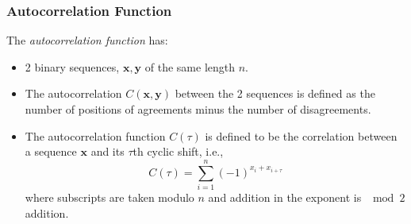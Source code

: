 \subsubsection{Autocorrelation Function}\label{subsubsec:Autocorrelation_Function}
\begin{definition}\label{def:LFSR_Autocorrelation_Function}
  The \emph{autocorrelation function} has:
  \begin{itemize}[noitemsep]
  \item 2 binary sequences, $\mathbf{x}, \mathbf{y}$ of the same length $n$.
  \item The autocorrelation $C(\mathbf{x}, \mathbf{y})$ between the 2 sequences is defined as the number of positions of agreements minus the number of disagreements.
  \item The autocorrelation function $C(\tau)$ is defined to be the correlation between a sequence $\mathbf{x}$ and its $\tau$th cyclic shift, i.e.,
    \begin{equation}\label{eq:LFSR_Autocorrelation_Function}
      C(\tau) = \sum\limits_{i=1}^{n} {(-1)}^{x_{i}+x_{i+\tau}}
    \end{equation}
    where subscripts are taken modulo $n$ and addition in the exponent is $\mod{2}$ addition.
  \end{itemize}
\end{definition}

